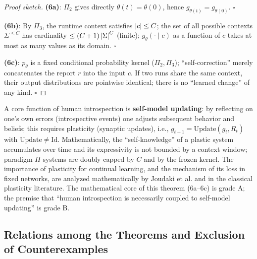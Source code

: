 \begin{proof}[Proof sketch]
\textbf{(6a)}: $\Pi_2$ gives directly $\theta(t) = \theta(0)$, hence $g_{\theta(t)} =
g_{\theta(0)}$. $\square$

\textbf{(6b)}: By $\Pi_3$, the runtime context satisfies $\left\lvert c \right\rvert \le C$; the set of all
possible contexts $\Sigma^{\le C}$ has cardinality $\le (C+1)\left\lvert \Sigma \right\rvert^{C}$ (finite);
$g_\theta(\cdot\mid c)$ as a function of $c$ takes at most as many values as its domain.
$\square$

\textbf{(6c)}: $p_\theta$ is a fixed conditional probability kernel ($\Pi_2, \Pi_3$);
``self-correction'' merely concatenates the report $r$ into the input $c$. If two runs share the
same context, their output distributions are pointwise identical; there is no
``learned change'' of any kind. $\square$
\end{proof}

\begin{remark}
A core function of human introspection is \textbf{self-model updating}: by reflecting on one's
own errors (introspective events) one adjusts subsequent behavior and beliefs; this requires
plasticity (synaptic updates), i.e., $g_{t+1} = \mathrm{Update}(g_t, R_t)$ with
$\mathrm{Update} \ne \mathrm{Id}$. Mathematically, the ``self-knowledge'' of a plastic system
accumulates over time and its expressivity is not bounded by a context window; paradigm-$\Pi$
systems are doubly capped by $C$ and by the frozen kernel. The importance of plasticity for
continual learning, and the mechanism of its loss in fixed networks, are analyzed
mathematically by Joudaki et al.\cite{joudaki-2025-plasticity} and in the classical plasticity
literature\cite{dayan-abbott-2001}. The mathematical core of this theorem (6a--6c) is grade A;
the premise that ``human introspection is necessarily coupled to self-model updating'' is grade
B.
\end{remark}

\subsection{Relations among the Theorems and Exclusion of Counterexamples}

